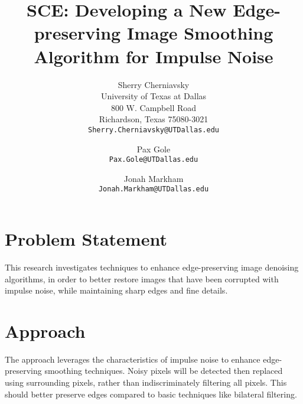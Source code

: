 \documentclass[10pt,twocolumn,letterpaper]{article}
\begin{document}
\title{SCE: Developing a New Edge-preserving Image Smoothing Algorithm for Impulse Noise}

\author{Sherry Cherniavsky\\
University of Texas at Dallas\\
800 W. Campbell Road\\
Richardson, Texas 75080-3021\\
{\tt\small Sherry.Cherniavsky@UTDallas.edu}
\and
Pax Gole\\
{\tt\small Pax.Gole@UTDallas.edu}
\and
Jonah Markham\\
{\tt\small Jonah.Markham@UTDallas.edu}
}
\maketitle


\section{Problem Statement}
This research investigates techniques to enhance edge-preserving image
denoising algorithms, in order to better restore images that have been
corrupted with impulse noise, while maintaining sharp edges and fine details.

\section{Approach}
The approach leverages the characteristics of impulse noise to enhance
edge-preserving smoothing techniques. Noisy pixels will be detected then
replaced using surrounding pixels, rather than indiscriminately filtering
all pixels. This should better preserve edges compared to basic techniques
like bilateral filtering.
\end{document}
